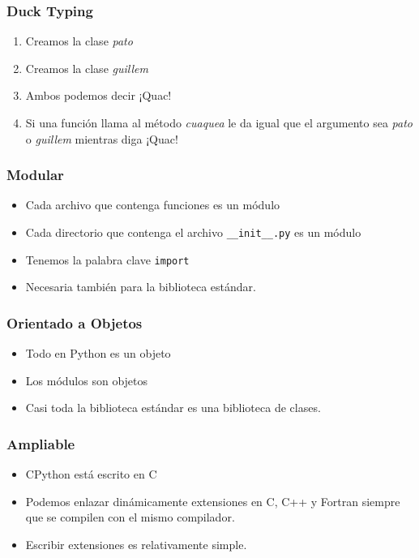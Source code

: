 \documentclass[12pt,mathserif,compress]{beamer}
\begin{document}
\begin{frame}
  \frametitle{Duck Typing}
\begin{center}
\end{center}
\begin{enumerate}
\item Creamos la clase \emph{pato}
\item Creamos la clase \emph{guillem}
\pause
\item Ambos podemos decir ¡Quac!
\pause
\item Si una función llama al método \emph{cuaquea} le da igual que el
  argumento sea \emph{pato} o \emph{guillem} mientras diga ¡Quac!
\end{enumerate}
\end{frame}

\begin{frame}
  \frametitle{Modular}
  \begin{itemize}
  \item Cada archivo que contenga funciones es un módulo
  \item Cada directorio que contenga el archivo \texttt{\_\_init\_\_.py}
    es un módulo
  \item Tenemos la palabra clave \texttt{import}
  \item Necesaria también para la biblioteca estándar.
  \end{itemize}
\end{frame}

\begin{frame}
  \frametitle{Orientado a Objetos}
  \begin{itemize}
  \item Todo en Python es un objeto
  \item Los módulos son objetos
  \item Casi toda la biblioteca estándar es una biblioteca de clases.
  \end{itemize}
\testcode
\end{frame}

\begin{frame}
  \frametitle{Ampliable}
  \begin{itemize}
  \item CPython está escrito en C
  \item Podemos enlazar dinámicamente extensiones en C, C++ y Fortran
    siempre que se compilen con el mismo compilador.
  \item Escribir extensiones es relativamente simple.
  \end{itemize}
\end{frame}
\end{document}
